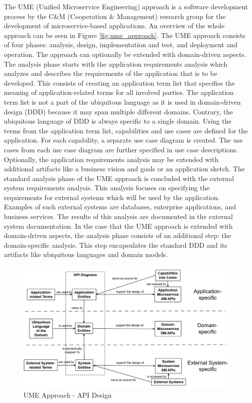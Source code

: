 The UME (Unified Microservice Engineering) approach is a software development
process by the C\&M (Cooperation \& Management) research group
for the development of microservice-based applications.
An overview of the whole approach can be seen in Figure \ref{fig:ume_approach}.
The UME approach consists of four phases: analysis, design, implementation and test,
and deployment and operation. The approach can optionally be extended with domain-driven aspects.
The analysis phase starts with the application requirements analysis
which analyzes and describes the requirements of the application that is to be developed.
This consists of creating an application term list that specifies the meaning
of application-related terms for all involved parties. The application term list
is not a part of the ubiquitous language as it is used in domain-driven design (DDD) because it
may span multiple different domains. Contrary, the ubiquitous language of DDD is always
specific to a single domain. Using the terms from the application term list,
capabilities and use cases are defined for the application. 
For each capability, a separate use case diagram is created.
The use cases from each use case diagram are further specified in use case descriptions.
Optionally, the application requirements analysis may be extended with additional artifacts
like a business vision and goals or an application sketch.
The standard analysis phase of the UME approach is concluded with the external system requirements analysis.
This analysis focuses on specifying the requirements for external systems which will be used
by the application. Examples of such external systems are databases, enterprise applications,
and business services. The results of this analysis are documented in the external system documentation.
In the case that the UME approach is extended with domain-driven aspects,
the analysis phase consists of an additional step: the domain-specific analysis.
This step encapsulates the standard DDD and its artifacts like ubiquitous languages
and domain models.

\begin{figure}[tb]
	\centering
	\includegraphics[width=\textwidth]{figures/4.2_ume_approach_api_design.png}
	\caption{UME Approach - API Design \cite{CM-W-DES}}
	\label{fig:ume_approach_api_design}
\end{figure}

